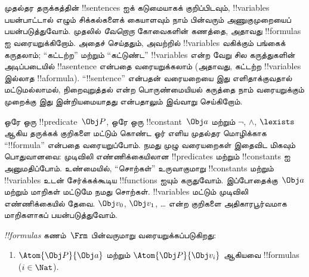 \documentclass[../../../include/open-logic-section]{subfiles}
\begin{document}

\section{}

முதல்தர தருக்கத்தின் !!{sentence}s ஐக் கடுமையாகக் குறிப்பிடவும்,
!!{variable}s பயன்பாட்டால் எழும் சிக்கல்களைக் கையாளவும் நாம் பின்வரும்
அணுகுமுறையைப் பயன்படுத்துவோம். முதலில் \emph{வேறொரு} கோவைகளின் கணத்தை,
அதாவது !!{formula}s ஐ வரையறுக்கிறோம். அதைச் செய்ததும், அவற்றில்
!!{variable}s வகிக்கும் பங்கைக் கருதலாம்; ``கட்டற்ற'' மற்றும் ``கட்டுண்ட''
!!{variable}s என்ற வேறு சில கருத்துகளின் அடிப்படையில் !!a{sentence} என்பதை
வரையறுக்கலாம் (அதாவது, கட்டற்ற !!{variable}s இல்லாத !!a{formula}).
``!!{sentence}'' என்பதன் வரையறையை இது எளிதாக்குவதால் மட்டுமல்லாமல்,
நிறைவுறுத்தல் என்ற பொருண்மையியல் கருத்தை நாம் வரையறுக்கும் முறைக்கு இது
இன்றியமையாதது என்பதாலும் இவ்வாறு செய்கிறோம்.

ஒரே ஒரு !!{predicate}~$\Obj P$, ஒரே ஒரு !!{constant}~$\Obj a$ மற்றும்
$\lnot$, $\land$, $\lexists$ ஆகிய தருக்கக் குறிகளை மட்டும் கொண்ட ஓர் எளிய
முதல்தர மொழிக்காக ``!!{formula}'' என்பதை வரையறுப்போம். நமது முழு வரையறைகள்
இதைவிட மிகவும் பொதுவானவை: முடிவிலி எண்ணிக்கையிலான !!{predicate}s மற்றும்
!!{constant}s ஐ அனுமதிப்போம். உண்மையில், ``சொற்கள்'' உருவாகுமாறு
!!{constant}s மற்றும் !!{variable}s உடன் சேர்க்கக்கூடிய !!{function}s ஐயும்
கருதுவோம். இப்போதைக்கு~$\Obj a$ மற்றும் மாறிகள் மட்டுமே நமது சொற்கள்.
!!{variable}s மட்டும் முடிவிலி எண்ணிக்கையில் தேவை. $\Obj v_0$, $\Obj v_1$,
\dots{} என்ற குறிகளை அதிகாரபூர்வமாக மாறிகளாகப் பயன்படுத்துவோம்.

\begin{defn}
\emph{!!{formula}s} கணம்~$\Frm$ பின்வருமாறு வரையறுக்கப்படுகிறது:
\begin{enumerate}
\item{} $\Atom{\Obj P}{\Obj a}$ மற்றும் $\Atom{\Obj
  P}{\Obj v_i}$ ஆகியவை !!{formula}s ($i \in \Nat$).




\end{enumerate}
\end{defn}
\end{document}
